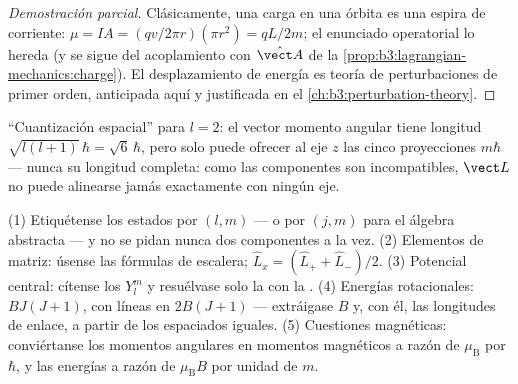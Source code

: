 \begin{proof}[Demostración parcial]
Clásicamente, una carga en una órbita es una espira de corriente: $\mu = IA =
(qv/2\pi r)(\pi r^2) = qL/2m$; el enunciado operatorial lo hereda
(y se sigue del acoplamiento con $\hat{\vect A}$ de la
\cref{prop:b3:lagrangian-mechanics:charge}). El desplazamiento de energía es
teoría de perturbaciones de primer orden, anticipada aquí y justificada en
el \cref{ch:b3:perturbation-theory}.
\end{proof}

\begin{omfigure}

{\small ``Cuantización espacial'' para $l = 2$: el vector momento angular
tiene longitud $\sqrt{l(l+1)}\,\hbar = \sqrt6\,\hbar$, pero solo puede
ofrecer al eje $z$ las cinco proyecciones $m\hbar$ --- nunca su longitud
completa: como las componentes son incompatibles, $\vect L$ no puede
alinearse jamás exactamente con ningún eje.}
\end{omfigure}

\begin{method}\label{met:b3:quantum-angular-momentum:method}
(1) Etiquétense los estados por $(l, m)$ --- o por $(j, m)$ para el álgebra
abstracta --- y no se pidan nunca dos componentes a la vez. (2) Elementos de
matriz: úsense las fórmulas de escalera; $\hat L_x = (\hat L_+ + \hat
L_-)/2$. (3) Potencial central: cítense los $Y_l^m$ y resuélvase solo la
 con la . (4) Energías rotacionales:
$BJ(J+1)$, con líneas en $2B(J+1)$ --- extráigase $B$ y, con él, las
longitudes de enlace, a partir de los espaciados iguales. (5) Cuestiones
magnéticas: conviértanse los momentos angulares en momentos magnéticos a
razón de $\mu_{\text{B}}$ por $\hbar$, y las energías a razón de
$\mu_{\text{B}}B$ por unidad de $m$.
\end{method}

